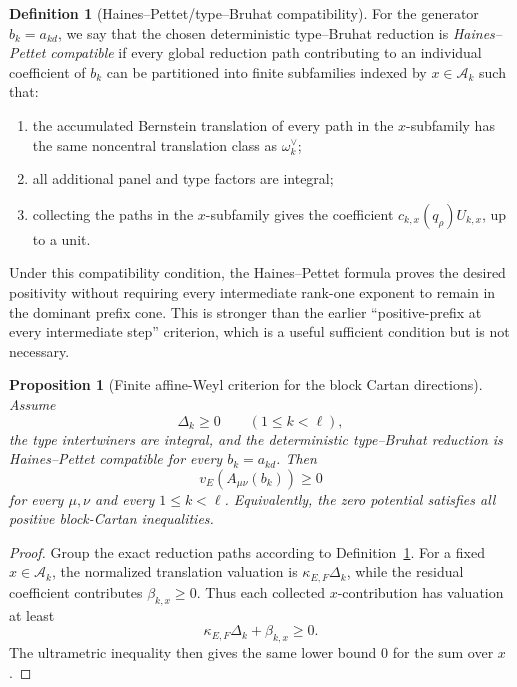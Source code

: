 \documentclass[12pt]{article}
\newtheorem{proposition}[theorem]{Proposition}
\theoremstyle{definition}
\newtheorem{definition}[theorem]{Definition}
\theoremstyle{remark}
\begin{document}
\begin{definition}[Haines--Pettet/type--Bruhat compatibility]
\label{def:HP-type-Bruhat-compatibility}
For the generator \(b_k=a_{kd}\), we say that the chosen deterministic
type--Bruhat reduction is \emph{Haines--Pettet compatible} if every global
reduction path contributing to an individual coefficient of \(b_k\) can be
partitioned into finite subfamilies indexed by
\(x\in\mathcal A_k\) such that:
\begin{enumerate}
 \item the accumulated Bernstein translation of every path in the
 \(x\)-subfamily has the same noncentral translation class as
 \(\omega_k^\vee\);
 \item all additional panel and type factors are integral;
 \item collecting the paths in the \(x\)-subfamily gives the coefficient
 \(c_{k,x}(q_\rho)U_{k,x}\), up to a unit.
\end{enumerate}
\end{definition}

Under this compatibility condition, the Haines--Pettet formula proves the
desired positivity without requiring every intermediate rank-one exponent
to remain in the dominant prefix cone.  This is stronger than the earlier
``positive-prefix at every intermediate step'' criterion, which is a useful
sufficient condition but is not necessary.

\begin{proposition}[Finite affine-Weyl criterion for the block Cartan directions]
\label{prop:HP-finite-affine-Weyl-criterion}
Assume
\[
 \Delta_k\geq0
 \qquad(1\leq k<\ell),
\]
the type intertwiners are integral, and the deterministic type--Bruhat
reduction is Haines--Pettet compatible for every
\(b_k=a_{kd}\).  Then
\[
 v_E(A_{\mu\nu}(b_k))\geq0
\]
for every \(\mu,\nu\) and every \(1\leq k<\ell\).  Equivalently,
the zero potential satisfies all positive block-Cartan inequalities.
\end{proposition}

\begin{proof}
Group the exact reduction paths according to
Definition~\ref{def:HP-type-Bruhat-compatibility}.  For a fixed
\(x\in\mathcal A_k\), the normalized translation valuation is
\(\kappa_{E,F}\Delta_k\), while the residual coefficient contributes
\(\beta_{k,x}\geq0\).  Thus each collected \(x\)-contribution has valuation
at least
\[
 \kappa_{E,F}\Delta_k+\beta_{k,x}\geq0.
\]
The ultrametric inequality then gives the same lower bound \(0\) for the sum
over \(x\).
\end{proof}
\end{document}
